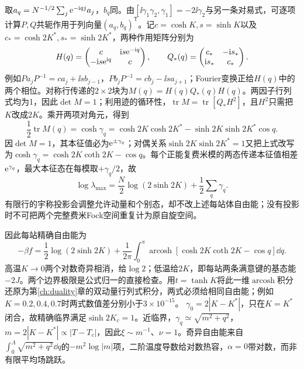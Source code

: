取$a_q=N^{-1/2}\sum_j\mathrm e^{-\mathrm i qj}a_j$，$b_q$同。由$[\ii\gamma_1\gamma_2,\gamma_1]=-2\ii\gamma_2$与另一条对易式，可逐项计算$P,Q$共轭作用于列向量$(a_q,b_q)^{\mathsf T}$。记$c=\cosh K,s=\sinh K$以及$c_*=\cosh2K^*,s_*=\sinh2K^*$，两种作用矩阵分别为
\begin{equation}
H(q)=\begin{pmatrix}c&\mathrm i s\mathrm e^{-\mathrm i q}\\-\mathrm i s\mathrm e^{\mathrm i q}&c\end{pmatrix},
\qquad
Q_*(q)=\begin{pmatrix}c_*&-\mathrm i s_*\\\mathrm i s_*&c_*\end{pmatrix}.
\end{equation}
例如$Pa_jP^{-1}=ca_j+\ii s b_{j-1}$，$Pb_jP^{-1}=cb_j-\ii s a_{j+1}$；Fourier变换正给$H(q)$中的两个相位。对称行传递的$2\times2$块为$M(q)=H(q)Q_*(q)H(q)$。两因子行列式均为1，因此$\det M=1$；利用迹的循环性，$\operatorname{tr}M=\operatorname{tr}[Q_*H^2]$，且$H^2$只需把$K$改成$2K$。乘开两项对角元，得到
\begin{equation}
\frac12\operatorname{tr}M(q)=\cosh\gamma_q
=\cosh2K\cosh2K^*-\sinh2K\sinh2K^*\cos q.
\end{equation}
因$\det M=1$，其本征值必为$\mathrm e^{\pm\gamma_q}$；对偶关系$\sinh2K\sinh2K^*=1$又把上式改写为$\cosh\gamma_q=\cosh2K\coth2K-\cos q$。每个正能复费米模的两态传递本征值相差$\mathrm e^{\gamma_q}$，最大本征态在每模取$+\gamma_q/2$，故
\begin{equation}
\log\lambda_{\max}=\frac N2\log(2\sinh2K)+\frac12\sum_q\gamma_q.
\end{equation}
有限行的宇称投影会调整允许动量和个别态，却不改上述每站体自由能；没有投影时不可把两个完整费米Fock空间重复计为原自旋空间。

因此每站精确自由能为
\begin{equation}
-\beta f=\frac12\log(2\sinh2K)+\frac1{2\pi}\int_0^\pi\operatorname{arcosh}[\cosh2K\coth2K-\cos q]\dd q.
\end{equation}
高温$K\to0$两个对数奇异相消，给$\log2$；低温给$2K$，即每站两条满意键的基态能$-2J$。两个边界极限是公式归一的直接检查。用$t=\tanh K$将此一维$\operatorname{arcosh}$积分还原为第\ref{ch:duality}章的双动量行列式积分，两式必须给相同自由能；例如$K=0.2,0.4,0.7$时两式数值差分别小于$3\times10^{-15}$。
$\gamma_0=2|K-K^*|$，只在$K=K^*$闭合，故精确临界满足$\sinh2K_c=1$。近临界，$\gamma_q\simeq\sqrt{m^2+q^2}$，$m=2|K-K^*|\propto|T-T_c|$，因此$\xi\sim m^{-1}$、$\nu=1$。奇异自由能来自$\int_0^\Lambda\sqrt{m^2+q^2}\dd q$的$-m^2\log|m|$项，二阶温度导数给对数热容，$\alpha=0$带对数，而非有限平均场跳跃。

